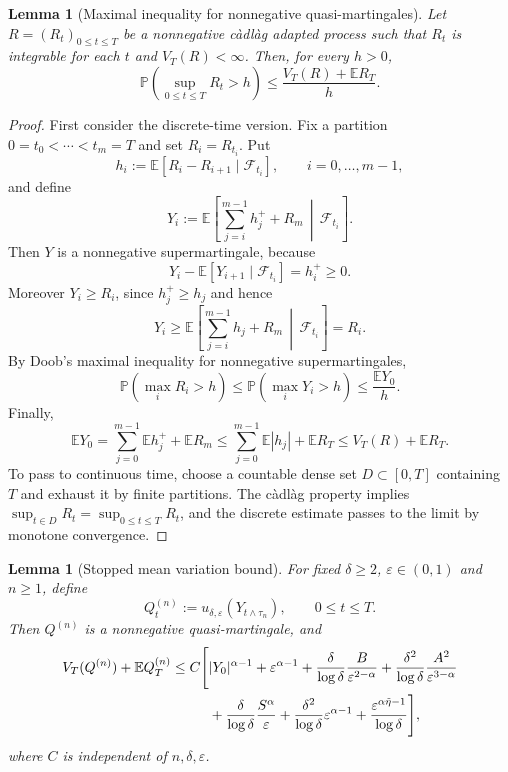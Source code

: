 \documentclass[11pt]{article}
\newtheorem{lemma}[theorem]{Lemma}
\newcommand{\E}{\mathbb{E}}
\newcommand{\Pbb}{\mathbb{P}}
\newcommand{\F}{\mathcal{F}}
\newcommand{\1}{\mathbf{1}}
\newcommand{\wt}{\tilde}
\newcommand{\eps}{\varepsilon}
\begin{document}
\begin{lemma}[Maximal inequality for nonnegative quasi-martingales]\label{lem:qm-max}
Let $R=(R_t)_{0\le t\le T}$ be a nonnegative c\`adl\`ag adapted process such that $R_t$ is integrable for each $t$ and $V_T(R)<\infty$. Then, for every $h>0$,
\[
  \Pbb\left(\sup_{0\le t\le T}R_t>h\right)
  \le \frac{V_T(R)+\E R_T}{h}.
\]
\end{lemma}

\begin{proof}
First consider the discrete-time version. Fix a partition $0=t_0<\cdots<t_m=T$ and set $R_i=R_{t_i}$. Put
\[
  h_i:=\E[R_i-R_{i+1}\mid\F_{t_i}],
  \qquad i=0,\dots,m-1,
\]
and define
\[
  Y_i:=\E\left[\sum_{j=i}^{m-1}h_j^+ + R_m\,\middle|\,\F_{t_i}\right].
\]
Then $Y$ is a nonnegative supermartingale, because
\[
  Y_i-\E[Y_{i+1}\mid\F_{t_i}]=h_i^+\ge0.
\]
Moreover $Y_i\ge R_i$, since $h_j^+\ge h_j$ and hence
\[
Y_i\ge \E\left[\sum_{j=i}^{m-1}h_j+R_m\,\middle|\,\F_{t_i}\right]=R_i.
\]
By Doob's maximal inequality for nonnegative supermartingales,
\[
  \Pbb\left(\max_i R_i>h\right)
  \le \Pbb\left(\max_i Y_i>h\right)
  \le \frac{\E Y_0}{h}.
\]
Finally,
\[
  \E Y_0=\sum_{j=0}^{m-1}\E h_j^+ + \E R_m
  \le \sum_{j=0}^{m-1}\E |h_j|+\E R_T
  \le V_T(R)+\E R_T.
\]
To pass to continuous time, choose a countable dense set $D\subset[0,T]$ containing $T$ and exhaust it by finite partitions. The c\`adl\`ag property implies $\sup_{t\in D}R_t=\sup_{0\le t\le T}R_t$, and the discrete estimate passes to the limit by monotone convergence.
\end{proof}

\begin{lemma}[Stopped mean variation bound]\label{lem:stopped-mean-variation}
For fixed $\delta\ge2$, $\eps\in(0,1)$ and $n\ge1$, define
\[
  Q_t^{(n)}:=u_{\delta,\eps}(Y_{t\wedge\tau_n}),
  \qquad 0\le t\le T.
\]
Then $Q^{(n)}$ is a nonnegative quasi-martingale, and
\begin{align}
V_T(Q^{(n)})+\E Q_T^{(n)}
\le C\Bigg[&|Y_0|^{\alpha-1}
+\eps^{\alpha-1}
+\frac{\delta}{\log\delta}\frac{B}{\eps^{2-\alpha}}
+\frac{\delta^2}{\log\delta}\frac{A^2}{\eps^{3-\alpha}} \notag\\
&+\frac{\delta}{\log\delta}\frac{S^\alpha}{\eps}
+\frac{\delta^2}{\log\delta}\eps^{\alpha-1}
+\frac{\eps^{\alpha\wt\eta-1}}{\log\delta}
\Bigg], \label{eq:stopped-mean-variation-bound}
\end{align}
where $C$ is independent of $n,\delta,\eps$.
\end{lemma}
\end{document}
